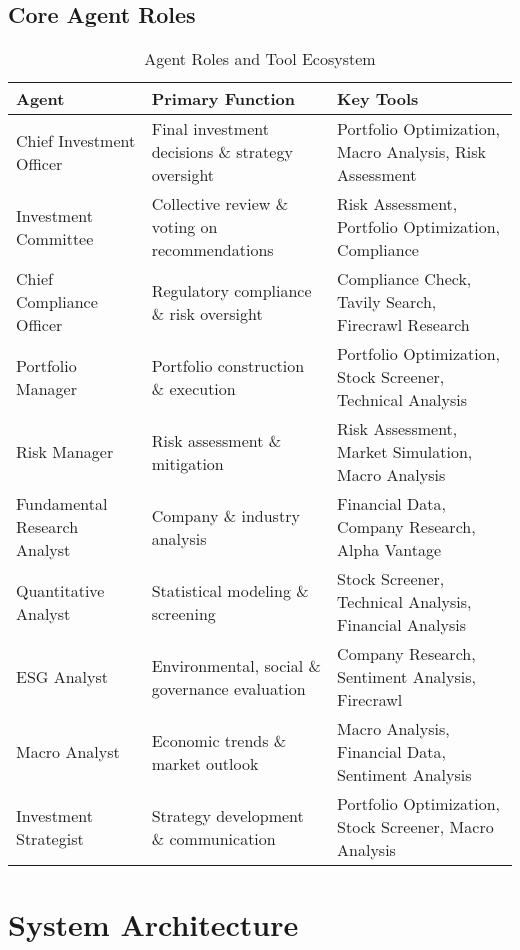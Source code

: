 \documentclass[11pt,a4paper]{article}
\begin{document}
\subsection{Core Agent Roles}

\begin{table}[H]
\centering
\small
\begin{tabular}{@{}p{3cm}p{4cm}p{4.5cm}@{}}
\toprule
\textbf{Agent} & \textbf{Primary Function} & \textbf{Key Tools} \\
\midrule
Chief Investment Officer & Final investment decisions \& strategy oversight & Portfolio Optimization, Macro Analysis, Risk Assessment \\
\midrule
Investment Committee & Collective review \& voting on recommendations & Risk Assessment, Portfolio Optimization, Compliance \\
\midrule
Chief Compliance Officer & Regulatory compliance \& risk oversight & Compliance Check, Tavily Search, Firecrawl Research \\
\midrule
Portfolio Manager & Portfolio construction \& execution & Portfolio Optimization, Stock Screener, Technical Analysis \\
\midrule
Risk Manager & Risk assessment \& mitigation & Risk Assessment, Market Simulation, Macro Analysis \\
\midrule
Fundamental Research Analyst & Company \& industry analysis & Financial Data, Company Research, Alpha Vantage \\
\midrule
Quantitative Analyst & Statistical modeling \& screening & Stock Screener, Technical Analysis, Financial Analysis \\
\midrule
ESG Analyst & Environmental, social \& governance evaluation & Company Research, Sentiment Analysis, Firecrawl \\
\midrule
Macro Analyst & Economic trends \& market outlook & Macro Analysis, Financial Data, Sentiment Analysis \\
\midrule
Investment Strategist & Strategy development \& communication & Portfolio Optimization, Stock Screener, Macro Analysis \\
\bottomrule
\end{tabular}
\caption{Agent Roles and Tool Ecosystem}
\end{table}

\section{System Architecture}
\end{document}
